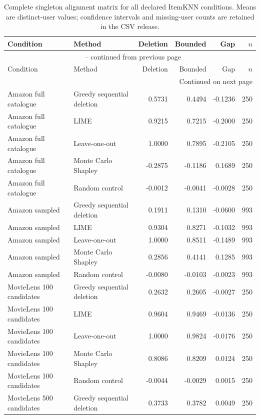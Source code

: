 \begin{longtable}{@{}p{}p{}rrrr@{}}
\caption{Complete singleton alignment matrix for all declared ItemKNN conditions. Means are distinct-user values; confidence intervals and missing-user counts are retained in the CSV release.}\label{tab:S1}\\
\toprule
Condition & Method & Deletion & Bounded & Gap & $n$ \\
\midrule
\endfirsthead
\multicolumn{6}{c}{\tablename\ \thetable{} -- continued from previous page}\\
\toprule
Condition & Method & Deletion & Bounded & Gap & $n$ \\
\midrule
\endhead
\midrule
\multicolumn{6}{r}{Continued on next page}\\
\endfoot
\bottomrule
\endlastfoot
Amazon full catalogue & Greedy sequential deletion & 0.5731 & 0.4494 & -0.1236 & 250 \\
Amazon full catalogue & LIME & 0.9215 & 0.7215 & -0.2000 & 250 \\
Amazon full catalogue & Leave-one-out & 1.0000 & 0.7895 & -0.2105 & 250 \\
Amazon full catalogue & Monte Carlo Shapley & -0.2875 & -0.1186 & 0.1689 & 250 \\
Amazon full catalogue & Random control & -0.0012 & -0.0041 & -0.0028 & 250 \\
Amazon sampled & Greedy sequential deletion & 0.1911 & 0.1310 & -0.0600 & 993 \\
Amazon sampled & LIME & 0.9304 & 0.8271 & -0.1032 & 993 \\
Amazon sampled & Leave-one-out & 1.0000 & 0.8511 & -0.1489 & 993 \\
Amazon sampled & Monte Carlo Shapley & 0.2856 & 0.4141 & 0.1285 & 993 \\
Amazon sampled & Random control & -0.0080 & -0.0103 & -0.0023 & 993 \\
MovieLens 100 candidates & Greedy sequential deletion & 0.2632 & 0.2605 & -0.0027 & 250 \\
MovieLens 100 candidates & LIME & 0.9604 & 0.9469 & -0.0136 & 250 \\
MovieLens 100 candidates & Leave-one-out & 1.0000 & 0.9824 & -0.0176 & 250 \\
MovieLens 100 candidates & Monte Carlo Shapley & 0.8086 & 0.8209 & 0.0124 & 250 \\
MovieLens 100 candidates & Random control & -0.0044 & -0.0029 & 0.0015 & 250 \\
MovieLens 500 candidates & Greedy sequential deletion & 0.3733 & 0.3782 & 0.0049 & 250 \\

\end{longtable}
